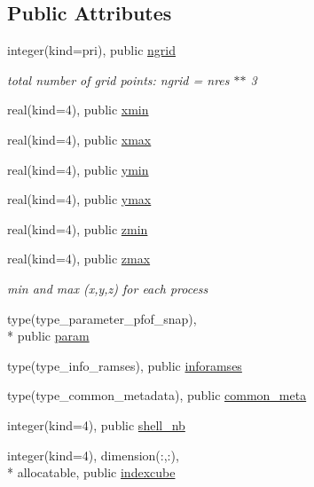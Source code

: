 \subsection*{Public Attributes}
\begin{DoxyCompactItemize}
\item 
integer(kind=pri), public \hyperlink{classmodvariables_ac94629517df3c5cfa8a31f61b2cd0725}{ngrid}
\begin{DoxyCompactList}\small\item\em total number of grid points\-: ngrid = nres $\ast$$\ast$ 3 \end{DoxyCompactList}\item 
real(kind=4), public \hyperlink{classmodvariables_afe10f659f4ebb9350a8ecd40e8d3716d}{xmin}
\item 
real(kind=4), public \hyperlink{classmodvariables_aa6894507e1844677f7c2908093f61950}{xmax}
\item 
real(kind=4), public \hyperlink{classmodvariables_acac6fa087befdc79eb687a91bc4a9efa}{ymin}
\item 
real(kind=4), public \hyperlink{classmodvariables_af6d344bd3756f326eb587c1497871da7}{ymax}
\item 
real(kind=4), public \hyperlink{classmodvariables_aa7cab7253a8166f7c81ee25238e89b9a}{zmin}
\item 
real(kind=4), public \hyperlink{classmodvariables_a5eed021bf6f608663c0259105d78dab1}{zmax}
\begin{DoxyCompactList}\small\item\em min and max (x,y,z) for each process \end{DoxyCompactList}\item 
type(type\-\_\-parameter\-\_\-pfof\-\_\-snap), \\*
public \hyperlink{classmodvariables_a582ad50b5bf32797acb78e1df3d62208}{param}
\item 
type(type\-\_\-info\-\_\-ramses), public \hyperlink{classmodvariables_a7d9b154c81790b61636ec708d445b14c}{inforamses}
\item 
type(type\-\_\-common\-\_\-metadata), public \hyperlink{classmodvariables_a11cf222c240e4152287181f343d97e4c}{common\-\_\-meta}
\item 
integer(kind=4), public \hyperlink{classmodvariables_a56011f110cb607bad4e96bbf7426d6d6}{shell\-\_\-nb}
\item 
integer(kind=4), dimension(\-:,\-:), \\*
allocatable, public \hyperlink{classmodvariables_a71f7a5aeca39e755788217f3b8093f9a}{indexcube}

\end{DoxyCompactItemize}
